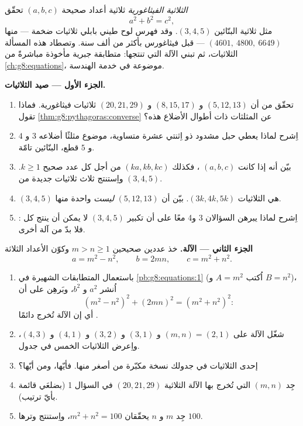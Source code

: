 \begin{problem}[{مسألة نهاية الأسبوع --- المثلثات القائمة الزاوية ذات الأعداد
الصحيحة، والمتطابقة $(m^2 - n^2)^2 + (2mn)^2 = (m^2 + n^2)^2$ التي
تولّدها كلها}]
\label{pb:g8:pythagoras:1}
\emph{الثلاثية الفيثاغورية} ثلاثية
أعداد صحيحة $(a, b, c)$ تحقّق
\[
a^2 + b^2 = c^2 ,
\]
مثل ثلاثية البنّائين $(3, 4, 5)$. وقد فهرس لوح طيني بابلي
ثلاثيات ضخمة --- منها $(4601,\ 4800,\ 6649)$ --- قبل
فيثاغورس بأكثر من ألف سنة. وتصطاد هذه المسألة الثلاثيات،
ثم تبني الآلة التي تنتجها: متطابقة جبرية
مأخوذة مباشرةً من \cref{ch:g8:equations}، موضوعة في خدمة
الهندسة.

\medskip
\noindent\textbf{الجزء الأول --- صيد الثلاثيات.}
\begin{enumerate}
  \item تحقّق من أن $(5, 12, 13)$ و $(8, 15, 17)$ و
        $(20, 21, 29)$ ثلاثيات فيثاغورية. فماذا تقول
        \cref{thm:g8:pythagoras:converse} عن المثلثات ذات
        أطوال الأضلاع هذه؟
  \item اِشرح لماذا يعطي حبل مشدود ذو اِثنتي عشرة  متساوية، موضوع
        مثلثًا أضلاعه $3$ و $4$ و $5$ قطع،
        البنّائين  تامّة.
  \item بيّن أنه إذا كانت $(a, b, c)$ ، فكذلك
        $(ka, kb, kc)$ من أجل كل عدد صحيح $k \geq 1$. واِستنتج
        ثلاث ثلاثيات جديدة من $(3, 4, 5)$.
  \item {} $(3, 4, 5)$ هي الثلاثيات
        $(3k, 4k, 5k)$. بيّن أن $(5, 12, 13)$ \emph{ليست} واحدة
        منها.
  \item اِشرح لماذا يبرهن السؤالان 3 و4 معًا على أن تكبير
        $(3, 4, 5)$ لا يمكن أن ينتج كل :
        فلا بدّ من آلة أخرى.
\end{enumerate}

\medskip
\noindent\textbf{الجزء الثاني --- الآلة.}
خذ عددين صحيحين $m > n \geq 1$ وكوّن الأعداد الثلاثة
\[
a = m^2 - n^2,
\qquad
b = 2mn,
\qquad
c = m^2 + n^2 .
\]
\begin{enumerate}[resume]
  \item باستعمال المتطابقات الشهيرة في
        \cref{pb:g8:equations:1} (اُكتب $A = m^2$ و $B = n^2$)،
        اُنشر $a^2$ و $b^2$، وبَرهِن على أن
        \[
        \left(m^2 - n^2\right)^2 + (2mn)^2
        = \left(m^2 + n^2\right)^2 :
        \]
        أي إن الآلة تُخرج دائمًا .
  \item شغّل الآلة على $(m, n) = (2, 1)$ و $(3, 1)$ و $(3, 2)$
        و $(4, 1)$ و $(4, 3)$، واِعرض الثلاثيات الخمس في
        جدول.
  \item إحدى الثلاثيات في جدولك نسخة مكبّرة من أصغر
        منها. فأيّها، ومن أيّها؟
  \item جِد $(m, n)$ التي تُخرج بها الآلة الثلاثية
        $(20, 21, 29)$ في السؤال 1 (بضلعَي قائمة بأيّ ترتيب).
  \item جِد $m$ و $n$ يحقّقان $m^2 + n^2 = 100$، واِستنتج
         وترها $100$.
\end{enumerate}


\end{problem}

